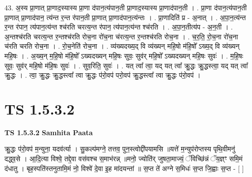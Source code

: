 \documentclass[17pt]{extarticle}
\begin{document}
43. अ॒स्य प्रा॒णात् प्रा॒णाद॒स्यास्य प्रा॒णा द॑पान॒त्य॑पान॒ती प्रा॒णाद॒स्यास्य प्रा॒णाद॑पान॒ती । . प्रा॒णा द॑पान॒त्य॑पान॒ती प्रा॒णात् प्रा॒णाद॑पान॒ त्य॑न्त र॒न्त र॑पान॒ती प्रा॒णात् प्रा॒णाद॑पान॒त्य॑न्तः । . प्रा॒णादिति॑ प्र - अ॒नात् । . अ॒पा॒न॒त्य॑न्त र॒न्त र॑पान॒ त्य॑पान॒त्य॑न्त श्च॑रति चरत्य॒न्त र॑पान॒ त्य॑पान॒त्य॑न्त श्च॑रति । . अ॒पा॒न॒तीत्य॑प - अ॒न॒ती । . अ॒न्तश्च॑रति चरत्य॒न्त र॒न्तश्च॑रति रोच॒ना रो॑च॒ना च॑रत्य॒न्त र॒न्तश्च॑रति रोच॒ना । . च॒र॒ति॒ रो॒च॒ना रो॑च॒ना च॑रति चरति रोच॒ना । . रो॒च॒नेति॑ रोच॒ना । . व्य॑ख्यदख्य॒द् वि व्य॑ख्यन् महि॒षो म॑हि॒षो᳚ ऽख्य॒द् वि व्य॑ख्यन् महि॒षः । . अ॒ख्य॒न् म॒हि॒षो म॑हि॒षो᳚ ऽख्यदख्यन् महि॒षः सुवः॒ सुव॑र् महि॒षो᳚ ऽख्यदख्यन् महि॒षः सुवः॑ । . म॒हि॒षः सुवः॒ सुव॑र् महि॒षो म॑हि॒षः सुवः॑ । . सुव॒रिति॒ सुवः॑ । . यत् त्वा᳚ त्वा॒ यद् यत् त्वा᳚ क्रु॒द्धः क्रु॒द्धस्त्वा॒ यद् यत् त्वा᳚ क्रु॒द्धः । . त्वा॒ क्रु॒द्धः क्रु॒द्धस्त्वा᳚ त्वा क्रु॒द्धः प॑रो॒वप॑ परो॒वप॑ क्रु॒द्धस्त्वा᳚ त्वा क्रु॒द्धः प॑रो॒वप॑ । \newline
\pagebreak
{}

\section{ TS 1.5.3.2 }

\textbf{TS 1.5.3.2 } \newline
\textbf{Samhita Paata} \newline

क्रु॒द्धः प॑रो॒वप॑ म॒न्युना॒ यदव॑र्त्या । सु॒कल्प॑मग्ने॒ तत्तव॒ पुन॒स्त्वोद्दी॑पयामसि ॥यत्ते॑ म॒न्युप॑रोप्तस्य पृथि॒वीमनु॑ दद्ध्व॒से । आ॒दि॒त्या विश्वे॒ तद्दे॒वा वस॑वश्च स॒माभ॑रन्न् ॥मनो॒ ज्योति॑र् जुषता॒माज्यं॒ ॅविच्छि॑न्नं ॅय॒ज्ञ्ꣳ समि॒मं द॑धातु । बृह॒स्पति॑स्तनुतामि॒मं नो॒ विश्वे॑ दे॒वा इ॒ह मा॑दयन्तां ॥ स॒प्त ते॑ अग्ने स॒मिधः॑ स॒प्त जि॒ह्वाः स॒प्त - [ ] \newline
\end{document}
